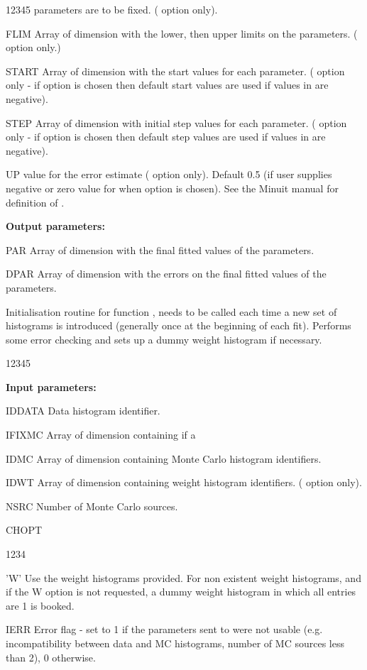 \begin{DLtt}{12345}
parameters are to be fixed. ( option only).
\item[FLIM] Array of dimension  with the lower, then
upper limits on the parameters. ( option only.)
\item[START] Array of dimension  with the start values for
each parameter. ( option only - if  option is chosen
then default start values are used if values in 
are negative).
\item[STEP] Array of dimension  with initial step values for
each parameter. ( option only - if  option is chosen
then default step values are used if values in  are negative).
\item[UP]  value for the error estimate ( option only).  Default
0.5 (if user supplies negative or zero value for  when  option is
chosen). See the Minuit manual for definition of .
 
\item[{\rm\bf Output parameters:}]
\item[PAR] Array of dimension  with the final fitted values
of the parameters.
\item[DPAR] Array of dimension  with the errors
on the final fitted values of the parameters.
\end{DLtt}

 
\Action
Initialisation routine for function , needs to be called
each time a new set of histograms is introduced (generally once at the
beginning of each fit). Performs some error checking and sets up a dummy
weight histogram if necessary.
 
\begin{DLtt}{12345}
\item[{\rm\bf Input parameters:}]
\item[IDDATA] Data histogram identifier.
\item[IFIXMC] Array of dimension  containing  if a
\item[IDMC] Array of dimension  containing Monte Carlo histogram
identifiers.
\item[IDWT] Array of dimension  containing weight histogram
identifiers. ( option only).
\item[NSRC] Number of Monte Carlo sources.
\item[CHOPT]
\begin{DLtt}{1234}
\item['W'] Use the weight histograms provided.  For non existent weight
histograms, and if the W option is not requested, a dummy weight histogram
in which all entries are 1 is booked.
\item[IERR] Error flag - set to 1 if the parameters sent to 
were not usable (e.g. incompatibility between data and MC histograms,
number of MC sources less than 2), 0 otherwise.
\end{DLtt}
\end{DLtt}
 

